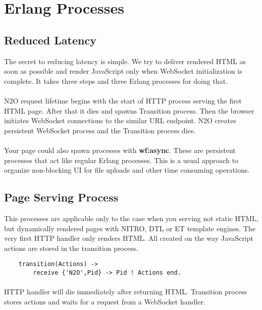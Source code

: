 \section{Erlang Processes}

\subsection{Reduced Latency}
The secret to reducing latency is simple. We try to deliver rendered HTML
as soon as possible and render JavaScript only when WebSocket initialization is complete.
It takes three steps and three Erlang processes for doing that.


\paragraph{}
N2O request lifetime begins with the start of HTTP process serving the first HTML page.
After that it dies and spawns Transition process.
Then the browser initiates WebSocket connections to the similar URL endpoint.
N2O creates persistent WebSocket process and the Transition process dies.

\paragraph{}
Your page could also spawn processes with {\bf wf:async}.
These are persistent processes that act like regular Erlang processes.
This is a usual approach to organize non-blocking UI for file uploads
and other time consuming operations.

\newpage
\subsection{Page Serving Process}
This processes are applicable only to the case when you serving not static HTML,
but dynamically rendered pages with NITRO, DTL or ET template engines.
The very first HTTP handler only renders HTML. All created on the way
JavaScript actions are stored in the transition process.

\begin{lstlisting}
    transition(Actions) ->
        receive {'N2O',Pid} -> Pid ! Actions end.
\end{lstlisting}

\paragraph{}
HTTP handler will die immediately after returning HTML. Transition process
stores actions and waits for a request from a WebSocket handler.


